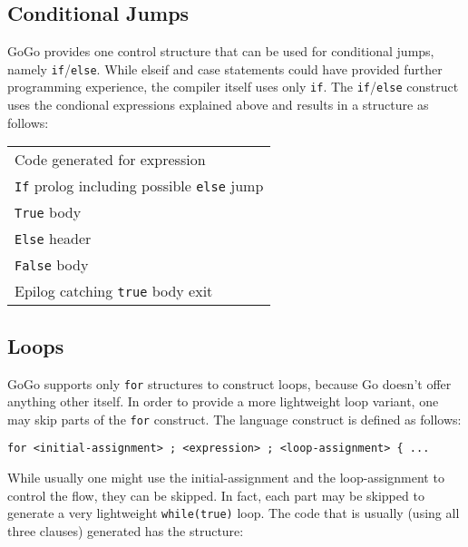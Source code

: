 \documentclass[a4paper]{scrreprt}
\begin{document}
    \subsection{Conditional Jumps}
      GoGo provides one control structure that can be used for conditional jumps,
      namely \texttt{if}/\texttt{else}. While elseif and case statements could
      have provided further programming experience, the compiler itself uses only
      \texttt{if}. The \texttt{if}/\texttt{else} construct uses the condional
      expressions explained above and results in a structure as follows:
      \begin{table}[hbt]
        \centering
        \begin{tabular}{l}
          \toprule
          Code generated for expression\\
          \texttt{If} prolog including possible \texttt{else} jump\\
          \hspace{0.5cm} \texttt{True} body\\
          \texttt{Else} header\\
          \hspace{0.5cm} \texttt{False} body\\
          Epilog catching \texttt{true} body exit\\
          \bottomrule
        \end{tabular}
      \end{table}

    \subsection{Loops}
      GoGo supports only \texttt{for} structures to construct loops, because
      Go doesn't offer anything other itself. In order to provide a more 
      lightweight loop variant, one may skip parts of the \texttt{for} construct.
      The language construct is defined as follows:
      \begin{lstlisting}
for <initial-assignment> ; <expression> ; <loop-assignment> { ...
      \end{lstlisting}

      While usually one might use the initial-assignment and the loop-assignment
      to control the flow, they can be skipped. In fact, each part may be skipped
      to generate a very lightweight \texttt{while(true)} loop. The code that is
      usually (using all three clauses) generated has the structure:
\end{document}

